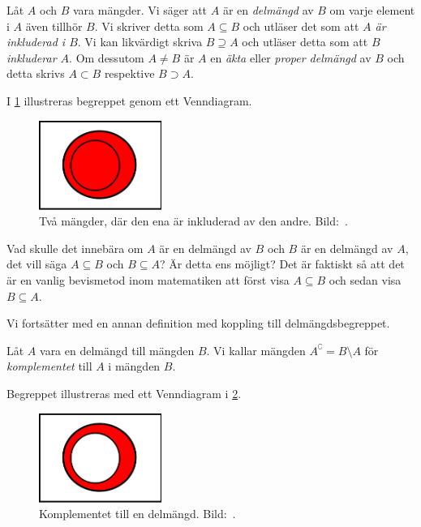 \begin{definition}\label{def:Delmangd}
  Låt \(A\) och \(B\) vara mängder.
  Vi säger att \(A\) är en \emph{delmängd} av \(B\) om varje element i \(A\)
  även tillhör \(B\).
  Vi skriver detta som \(A\subseteq B\) och utläser det som att \emph{\(A\)
  är inkluderad i \(B\)}.
  Vi kan likvärdigt skriva \(B\supseteq A\) och utläser detta som att
  \emph{\(B\) inkluderar \(A\)}.
  Om dessutom \(A\neq B\) är \(A\) en \emph{äkta} eller \emph{proper
  delmängd} av \(B\) och detta skrivs \(A\subset B\) respektive
  \(B\supset A\).
\end{definition}
I \cref{fig:Delmangd} illustreras begreppet genom ett Venndiagram.
\begin{figure}
  \includegraphics[width=4cm]{figs/subset.pdf}
  \caption{%
    Två mängder, där den ena är inkluderad av den andre.
    Bild:~\cite{Wikipedia2013Set}.
  }\label{fig:Delmangd}
\end{figure}

\begin{exercise}
  Vad skulle det innebära om \(A\) är en delmängd av \(B\) och \(B\) är en
  delmängd av \(A\), det vill säga \(A\subseteq B\) och \(B\subseteq A\)?
  Är detta ens möjligt?
  Det är faktiskt så att det är en vanlig bevismetod inom matematiken att
  först visa \(A\subseteq B\) och sedan visa \(B\subseteq A\).
\end{exercise}

Vi fortsätter med en annan definition med koppling till delmängdsbegreppet.
\begin{definition}\label{def:Komplement}
  Låt \(A\) vara en delmängd till mängden \(B\).
  Vi kallar mängden \(A^\complement = B\setminus A\) för \emph{komplementet}
  till \(A\) i mängden \(B\).
\end{definition}
Begreppet illustreras med ett Venndiagram i \cref{fig:Komplement}.
\begin{figure}
  \includegraphics[width=4cm]{figs/complement.pdf}
  \caption{%
    Komplementet till en delmängd.
    Bild:~\cite{Wikipedia2013Set}.
  }\label{fig:Komplement}
\end{figure}

